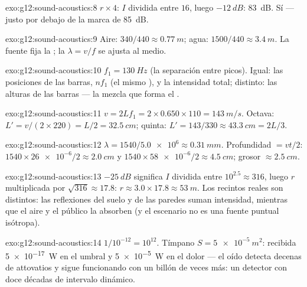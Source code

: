 \begin{solution}{exo:g12:sound-acoustics:8}
$r \times 4$: $I$ dividida entre $16$, luego $-\qty{12}{dB}$:
\qty{83}{dB}. Sí --- justo por debajo de la marca de \qty{85}{dB}.
\end{solution}

\begin{solution}{exo:g12:sound-acoustics:9}
Aire: $340/440 \approx \qty{0.77}{m}$; agua:
$1500/440 \approx \qty{3.4}{m}$. La fuente fija la ; la
 $\lambda = v/f$ se ajusta al medio.
\end{solution}

\begin{solution}{exo:g12:sound-acoustics:10}
$f_1 = \qty{130}{Hz}$ (la separación entre picos). Igual: las
posiciones de las barras, $nf_1$ (el mismo ), y la intensidad total;
distinto: las alturas de las barras --- la mezcla que forma el .
\end{solution}

\begin{solution}{exo:g12:sound-acoustics:11}
$v = 2Lf_1 = 2 \times 0.650 \times 110 = \qty{143}{m/s}$. Octava:
$L' = v/(2 \times 220) = L/2 = \qty{32.5}{cm}$; quinta:
$L' = 143/330 \approx \qty{43.3}{cm} = 2L/3$.
\end{solution}

\begin{solution}{exo:g12:sound-acoustics:12}
$\lambda = 1540/\num{5.0e6} \approx \qty{0.31}{mm}$. Profundidad
$= vt/2$: $1540 \times \num{26e-6}/2 \approx \qty{2.0}{cm}$ y
$1540 \times \num{58e-6}/2 \approx \qty{4.5}{cm}$; grosor
$\approx \qty{2.5}{cm}$.
\end{solution}

\begin{solution}{exo:g12:sound-acoustics:13}
$-\qty{25}{dB}$ significa $I$ dividida entre
$10^{2.5} \approx 316$, luego $r$ multiplicada por
$\sqrt{316} \approx 17.8$: $r \approx 3.0 \times 17.8 \approx
\qty{53}{m}$. Los recintos reales son distintos: las reflexiones del
suelo y de las paredes suman intensidad, mientras que el aire y el
público la absorben (y el escenario no es una fuente puntual
isótropa).
\end{solution}

\begin{solution}{exo:g12:sound-acoustics:14}
$1/10^{-12} = 10^{12}$. Tímpano $S = \qty{5e-5}{m^2}$: 
recibida \qty{5e-17}{W} en el umbral y \qty{5e-5}{W} en el dolor --- el
oído detecta decenas de attovatios y sigue funcionando con un billón de
veces más: un detector con doce décadas de intervalo dinámico.
\end{solution}

